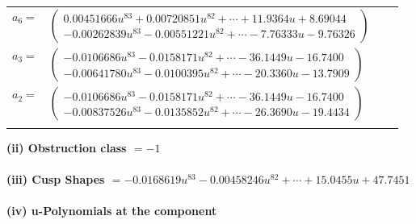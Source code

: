 \documentclass[1p]{elsarticle_modified}
\theoremstyle{definition}
\begin{document}
\begin{tabular}{m{7pt} m{180pt} m{7pt} m{180pt} }
\flushright $a_{6}=$&$\begin{pmatrix}0.00451666 u^{83}+0.00720851 u^{82}+\cdots+11.9364 u+8.69044\\-0.00262839 u^{83}-0.00551221 u^{82}+\cdots-7.76333 u-9.76326\end{pmatrix}$ \\
\flushright $a_{3}=$&$\begin{pmatrix}-0.0106686 u^{83}-0.0158171 u^{82}+\cdots-36.1449 u-16.7400\\-0.00641780 u^{83}-0.0100395 u^{82}+\cdots-20.3360 u-13.7909\end{pmatrix}$ \\
\flushright $a_{2}=$&$\begin{pmatrix}-0.0106686 u^{83}-0.0158171 u^{82}+\cdots-36.1449 u-16.7400\\-0.00837526 u^{83}-0.0135852 u^{82}+\cdots-26.3690 u-19.4434\end{pmatrix}$\\&\end{tabular}
\flushleft \textbf{(ii) Obstruction class $= -1$}\\~\\
\flushleft \textbf{(iii) Cusp Shapes $= -0.0168619 u^{83}-0.00458246 u^{82}+\cdots+15.0455 u+47.7451$}\\~\\
\newpage\renewcommand{\arraystretch}{1}
\flushleft \textbf{(iv) u-Polynomials at the component}\newline \\
\end{document}
